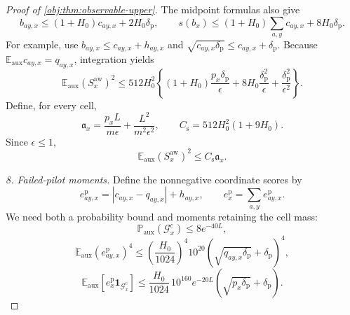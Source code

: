 \documentclass[11pt]{article}
\begin{document}
\begin{proof}[Proof of \cref{obj:thm:observable-upper}]
The midpoint formulas also give
\[
b_{ay,x}\le(1+H_0)c_{ay,x}+2H_0\delta_{\mathrm p},
\qquad
s(b_x)\le(1+H_0)\sum_{a,y}c_{ay,x}+8H_0\delta_{\mathrm p}.
\]
For example, use \(b_{ay,x}\le c_{ay,x}+h_{ay,x}\) and
\(\sqrt{c_{ay,x}\delta_{\mathrm p}}\le c_{ay,x}+\delta_{\mathrm p}\).
Because \(\mathbb E_{\mathrm{aux}}c_{ay,x}=q_{ay,x}\), integration yields
\[
\mathbb E_{\mathrm{aux}}(S_x^{\mathrm{aw}})^2
\le512H_0^2
\left\{
(1+H_0)\frac{p_x\delta_{\mathrm p}}{\epsilon}
+8H_0\frac{\delta_{\mathrm p}^2}{\epsilon}
+\frac{\delta_{\mathrm p}^2}{\epsilon^2}
\right\}.
\]
Define, for every cell,
\[
\mathfrak a_x
=
\frac{p_xL}{m\epsilon}
+\frac{L^2}{m^2\epsilon^2},
\qquad
C_{\mathrm s}=512H_0^2(1+9H_0).
\]
Since \(\epsilon\le1\),
\[
\mathbb E_{\mathrm{aux}}(S_x^{\mathrm{aw}})^2
\le C_{\mathrm s}\mathfrak a_x.
\]

\textit{8. Failed-pilot moments.}
Define the nonnegative coordinate scores by
\[
e_{ay,x}^{\mathrm p}
=
|c_{ay,x}-q_{ay,x}|+h_{ay,x},
\qquad
e_x^{\mathrm p}=\sum_{a,y}e_{ay,x}^{\mathrm p}.
\]
We need both a probability bound and moments retaining the cell mass:
\[
\mathbb P_{\mathrm{aux}}(\mathcal G_x^c)\le8e^{-40L},
\]
\[
\mathbb E_{\mathrm{aux}}(e_{ay,x}^{\mathrm p})^4
\le
\left(\frac{H_0}{1024}\right)^4
10^{20}
\left(\sqrt{q_{ay,x}\delta_{\mathrm p}}+\delta_{\mathrm p}\right)^4,
\]
\[
\mathbb E_{\mathrm{aux}}
[e_x^{\mathrm p}\mathbf1_{\mathcal G_x^c}]
\le
\frac{H_0}{1024}\,10^{160}e^{-20L}
\left(\sqrt{p_x\delta_{\mathrm p}}+\delta_{\mathrm p}\right).
\]


\end{proof}
\end{document}
